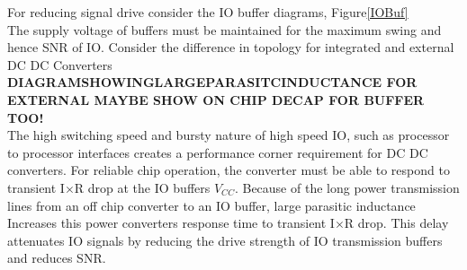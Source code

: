 \documentclass[letterpaper,twocolumn,10pt]{article}
\begin{document}
For reducing signal drive consider the IO buffer diagrams, Figure\ref{IOBuf}\\ %
The supply voltage of buffers must be maintained for the maximum swing and hence SNR of IO. Consider the difference in topology for integrated and external DC DC Converters\\
\textbf{DIAGRAMSHOWINGLARGEPARASITCINDUCTANCE FOR EXTERNAL MAYBE SHOW ON CHIP DECAP FOR BUFFER TOO!}\\
The high switching speed and bursty nature of high speed IO, such as processor to processor interfaces creates a performance corner requirement for DC DC converters. For reliable chip operation, the converter must be able to respond to transient I$\times$R drop at the IO buffers $V_{CC}$. Because of the long power transmission lines from an off chip converter to an IO buffer, large parasitic inductance Increases this power converters response time to transient I$\times$R drop. This delay attenuates IO signals by reducing the drive strength of IO transmission buffers and reduces SNR.\\
\end{document}
